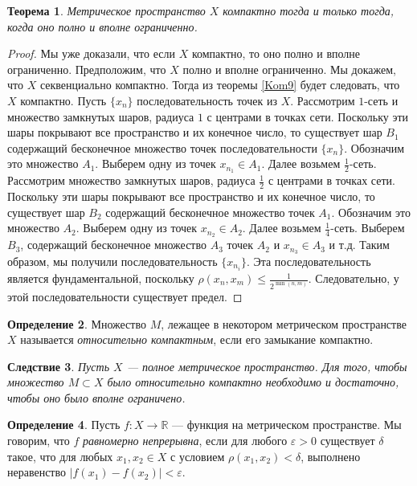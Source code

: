 \documentclass[12pt, titlepage, oneside]{amsbook}
\newcommand{\RR}{\mathbb{R}}
\newtheorem{theorem}{Теорема}[chapter]
\newtheorem{corollary}[theorem]{Следствие}
\theoremstyle{definition}
\newtheorem{definition}[theorem]{Определение}
\theoremstyle{remark}
\begin{document}
\begin{theorem}
	\label{Kom10}
	Метрическое пространство $X$ компактно тогда и только тогда, когда оно полно и вполне ограниченно.
\end{theorem}

\begin{proof}
	Мы уже доказали, что если $X$ компактно, то оно полно и вполне ограниченно. Предположим, что $X$ полно и вполне ограниченно. Мы докажем, что $X$ секвенциально компактно. Тогда из теоремы \ref{Kom9} будет следовать, что $X$ компактно. Пусть $\{x_n\}$ последовательность точек из $X$. Рассмотрим $1$-сеть и множество замкнутых шаров, радиуса $1$ с центрами в точках сети. Поскольку эти шары покрывают все пространство и их конечное число, то существует шар $B_1$ содержащий бесконечное множество точек последовательности $\{x_n\}$. Обозначим это множество $A_1$. Выберем одну из точек $x_{n_1}\in A_1$. Далее возьмем $\frac{1}{2}$-сеть. Рассмотрим множество замкнутых шаров, радиуса $\frac{1}{2}$ с центрами в точках сети. Поскольку эти шары покрывают все пространство и их конечное число, то существует шар $B_2$ содержащий бесконечное множество точек $A_1$. Обозначим это множество $A_2$. Выберем одну из точек $x_{n_2}\in A_2$. Далее возьмем $\frac{1}{4}$-сеть. Выберем $B_3$, содержащий бесконечное множество $A_3$ точек $A_2$ и $x_{n_3}\in A_3$ и т.д. Таким образом, мы получили последовательность $\{x_{n_i}\}$. Эта последовательность является фундаментальной, поскольку $\rho(x_n,x_m)\leq\frac{1}{2^{\min(n,m)}}$. Следовательно, у этой последовательности существует предел.
\end{proof}

\begin{definition}
	Множество $M$, лежащее в некотором метрическом пространстве $X$ называется \emph{относительно компактным}, если его замыкание компактно.
\end{definition}

\begin{corollary}
	\label{Kom10-1}
	Пусть $X$ --- полное метрическое пространство. Для того, чтобы множество $M\subset X$ было относительно компактно необходимо и достаточно, чтобы оно было вполне ограничено.
\end{corollary}


\begin{definition}
	Пусть $f\colon X\rightarrow\RR$ --- функция на метрическом пространстве. Мы говорим, что $f$ \emph{равномерно непрерывна}, если для любого $\varepsilon>0$ существует $\delta$ такое, что для любых $x_1,x_2\in X$ с условием $\rho(x_1,x_2)<\delta$, выполнено неравенство $|f(x_1)-f(x_2)|<\varepsilon$.
\end{definition}
\end{document}
